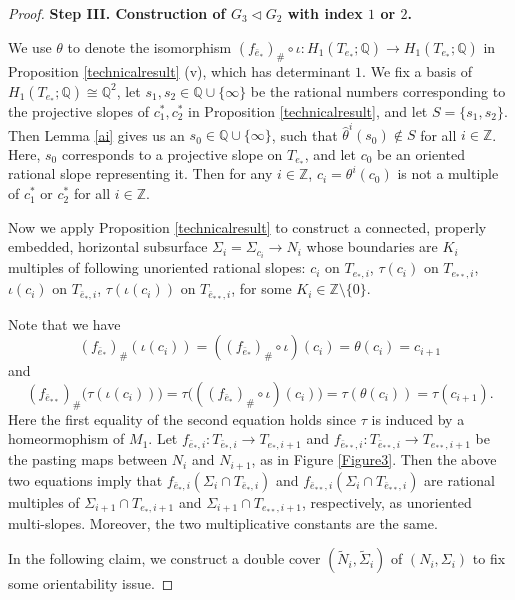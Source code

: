 \documentclass{amsart}
\numberwithin{equation}{section}
\theoremstyle{definition}
\begin{document}
\begin{proof}
\bigskip

{\bf Step III. Construction of $G_3\vartriangleleft G_2$ with index $1$ or $2$.} 

We use $\theta$ to denote the isomorphism $(f_{\bar{e}_*})_{\#}\circ \iota:H_1(T_{e_*};\mathbb{Q})\to H_1(T_{e_*};\mathbb{Q})$ in Proposition \ref{technicalresult} (v), which has determinant $1$. We fix a basis of $H_1(T_{e_*};\mathbb{Q})\cong \mathbb{Q}^2$, let $s_1,s_2 \in \mathbb{Q}\cup \{\infty\}$ be the rational numbers corresponding to the projective slopes of $c_1^*,c_2^*$ in Proposition \ref{technicalresult}, and let $S=\{s_1,s_2\}$. Then Lemma \ref{ai} gives us an $s_0\in \mathbb{Q}\cup \{\infty\}$, such that $\hat{\theta}^i(s_0)\notin S$ for all $i\in \mathbb{Z}$. Here, $s_0$ corresponds to a projective slope on $T_{e_*}$, and let $c_0$ be an oriented rational slope representing it. Then for any $i\in \mathbb{Z}$, $c_i=\theta^i(c_0)$ is not a multiple of $c_1^*$ or $c_2^*$ for all $i\in \mathbb{Z}$. 

Now we apply Proposition \ref{technicalresult} to construct a connected, properly embedded, horizontal subsurface $\Sigma_i=\Sigma_{c_i}\to $$N_i$ whose boundaries are $K_i$ multiples of following unoriented rational slopes: $c_i$ on $T_{e_*,i}$, $\tau(c_i)$ on $T_{e_{**},i}$, $\iota(c_i)$ on $T_{\bar{e}_*,i}$, $\tau(\iota(c_i))$ on $T_{\bar{e}_{**},i}$, for some $K_i\in \mathbb{Z}\setminus \{0\}$.

Note that we have 
$$(f_{\bar{e}_*})_{\#}(\iota(c_i))=((f_{\bar{e}_*})_{\#}\circ \iota)(c_i)=\theta(c_i)=c_{i+1}$$ and 
$$(f_{\bar{e}_{**}})_{\#}\big(\tau(\iota(c_i))\big)=\tau\big(((f_{\bar{e}_*})_{\#}\circ \iota) (c_i)\big)=\tau(\theta(c_i))=\tau(c_{i+1}).$$ Here the first equality of the second equation holds since $\tau$ is induced by a homeormophism of $M_1$. 
Let $f_{\bar{e}_*,i}:T_{\bar{e}_*,i}\to T_{e_{*},i+1}$ and $f_{\bar{e}_{**},i}:T_{\bar{e}_{**},i}\to T_{e_{**},i+1}$ be the pasting maps between $N_{i}$ and $N_{i+1}$, as in Figure \ref{Figure3}. Then the above two equations imply that $f_{\bar{e}_*,i}(\Sigma_{i}\cap T_{\bar{e}_*,i})$ and $f_{\bar{e}_{**},i}(\Sigma_{i}\cap T_{\bar{e}_{**},i})$ are rational multiples of $\Sigma_{i+1}\cap T_{e_*,i+1}$ and $\Sigma_{i+1}\cap T_{e_{**},i+1}$, respectively, as unoriented multi-slopes. Moreover, the two multiplicative constants are the same.




In the following claim, we construct a double cover $(\tilde{N}_i,\tilde{\Sigma}_i)$ of $(N_i,\Sigma_i)$ to fix some orientability issue.


\end{proof}
\end{document}
